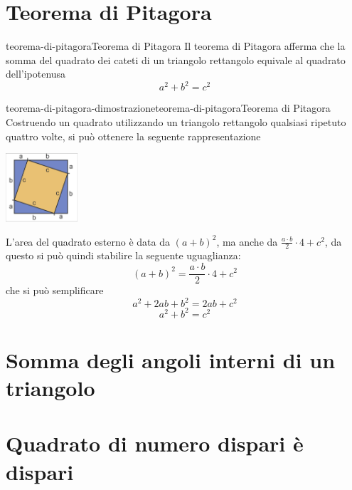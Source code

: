 \documentclass[preview]{standalone}
\begin{document}
\genpage

\section{Teorema di Pitagora}

\begin{snippettheorem}{teorema-di-pitagora}{Teorema di Pitagora}
  Il teorema di Pitagora afferma che la somma del quadrato dei cateti di un triangolo rettangolo
  equivale al quadrato dell'ipotenusa
  \[
    a^2 + b^2 = c^2
  \]
\end{snippettheorem}

\begin{snippetproof}{teorema-di-pitagora-dimostrazione}{teorema-di-pitagora}{Teorema di Pitagora}
    Costruendo un quadrato utilizzando un triangolo rettangolo qualsiasi ripetuto quattro volte,
    si può ottenere la seguente rappresentazione

    \vspace{0.5cm}

    \begin{center}
        \includegraphics[width=0.2\textwidth]{resources/pythagorean-theorem-proof.png}
    \end{center}

    \vspace{0.5cm}

    L'area del quadrato esterno è data da \( (a + b)^2 \), ma anche da \( \frac{a \cdot b}{2} \cdot 4 + c^2\), da questo
    si può quindi stabilire la seguente uguaglianza:
    \[ 
       (a + b)^2 = \frac{a \cdot b}{2} \cdot 4 + c^2
    \]
    che si può semplificare
    \[ 
      a^2 + 2ab + b^2 = 2ab + c^2 
    \]
    \[ 
      a^2 + b^2 = c^2
    \]
\end{snippetproof}

\section{Somma degli angoli interni di un triangolo}

\section{Quadrato di numero dispari è dispari}
\end{document}
